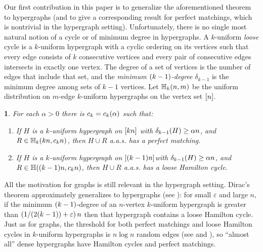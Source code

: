 \documentclass[11pt,english]{article}
\theoremstyle{plain}
\newtheorem{thm}{\protect\theoremname}
\theoremstyle{definition}
\theoremstyle{definition}
\theoremstyle{plain}
\theoremstyle{plain}
\theoremstyle{plain}
\theoremstyle{plain}
\theoremstyle{remark}
\theoremstyle{remark}
\let\originalleft\left
\let\originalright\right
\renewcommand{\left}{\mathopen{}\mathclose\bgroup\originalleft}
\renewcommand{\right}{\aftergroup\egroup\originalright}
\providecommand{\theoremname}{Theorem}
\begin{document}
Our first contribution in this paper is to generalize the aforementioned
theorem to hypergraphs (and to give a corresponding result for perfect
matchings, which is nontrivial in the hypergraph setting). Unfortunately,
there is no single most natural notion of a cycle or of minimum degree
in hypergraphs. A $k$-uniform \emph{loose} cycle is a $k$-uniform
hypergraph with a cyclic ordering on its vertices such that every
edge consists of $k$ consecutive vertices and every pair of consecutive
edges intersects in exactly one vertex. The degree of a set of vertices
is the number of edges that include that set, and the \emph{minimum
$\left(k-1\right)$-degree }$\delta_{k-1}$ is the minimum degree
among sets of $k-1$ vertices. Let $\HH_{k}\left(n,m\right)$ be
the uniform distribution on $m$-edge $k$-uniform hypergraphs on
the vertex set $\range n$.
\begin{thm}
\label{thm:hypergraph-theorems}For each $\alpha>0$ there is $\chyp=\chyp\left(\alpha\right)$ such that:

\begin{enumerate}[topsep=0px,label=(\alph*)]

\item{\label{itm:hypergraph-matching-theorem}If $H$ is
a $k$-uniform hypergraph on $\range{kn}$ with $\delta_{k-1}\left(H\right)\ge\alpha n$,
and $R\in\HH_{k}\left(kn,\chypmat n\right)$, then
$H\cup R$ a.a.s.{} has a perfect matching.}

\item{\label{itm:hypergraph-cycle-theorem}If $H$ is
a $k$-uniform hypergraph on $\range{\left(k-1\right)n}$with
$\delta_{k-1}\left(H\right)\ge\alpha n$, and $R\in\HH\left(\left(k-1\right)n,\chypham n\right)$,
then $H\cup R$ a.a.s.{} has a loose Hamilton cycle.}

\end{enumerate}
\end{thm}
All the motivation for graphs is still relevant in the hypergraph setting. Dirac's theorem approximately generalizes to hypergraphs (see \cite{KKMO11}): for small $\varepsilon$ and large $n$, if the minimum $\left(k-1\right)$-degree of an $n$-vertex $k$-uniform hypergraph is greater than $\left(1/\left(2\left(k-1\right)\right)+\varepsilon\right)\,n$ then that hypergraph contains a loose Hamilton cycle. Just as for graphs, the threshold for both perfect matchings and loose Hamilton cycles in $k$-uniform hypergraphs is $n\log n$ random
edges (see \cite{DF11} and \cite[Corollary~2.6]{JKV08}), so ``almost
all'' dense hypergraphs have Hamilton cycles and perfect matchings.
\end{document}

